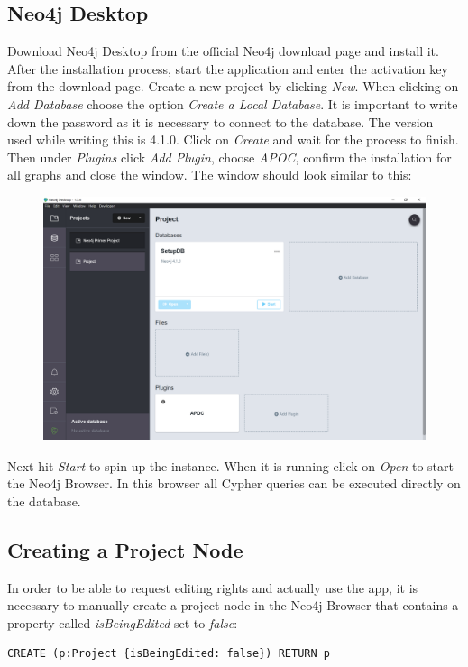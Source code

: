\subsection{Neo4j Desktop}
\label{chap:NeoDesktop}
Download Neo4j Desktop from the official Neo4j download page \cite{NeoDownload} and install it. After the installation process, start the application and enter the activation key from the download page.
Create a new project by clicking \emph{New}. When clicking on \emph{Add Database} choose the option \emph{Create a Local Database}. It is important to write down the password as it is necessary to connect to the database. The version used while writing this is 4.1.0. Click on \emph{Create} and wait for the process to finish.
Then under \emph{Plugins} click \emph{Add Plugin}, choose \emph{APOC}, confirm the installation for all graphs and close the window. The window should look similar to this:
\begin{figure}[H]
\centering
\includegraphics[scale=.4]{Bilder/NeoDesktopInit.png}
\label{ex:NeoDesktop}
\end{figure}

Next hit \emph{Start} to spin up the instance. When it is running click on \emph{Open} to start the Neo4j Browser. In this browser all Cypher queries can be executed directly on the database.

\newpage
\subsection{Creating a Project Node}
In order to be able to request editing rights and actually use the app, it is necessary to manually create a project node in the Neo4j Browser that contains a property called \emph{isBeingEdited} set to \emph{false}:
\lstset{language=Cypher}
\begin{lstlisting}[caption={Creating the necessary Project Node}]
CREATE (p:Project {isBeingEdited: false}) RETURN p
\end{lstlisting}

